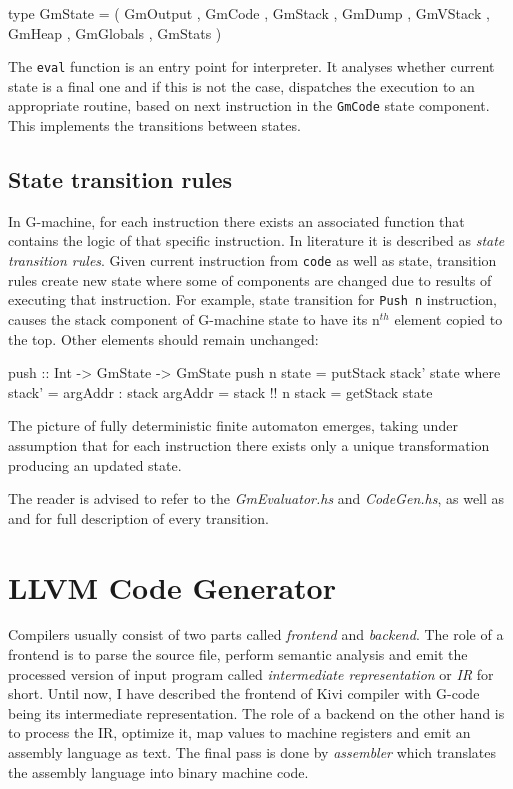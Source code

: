 \documentclass[12pt,a4paper]{report}
\begin{document}
\vspace*{0.2in}
\begin{code}[style=haskell]
  type GmState = ( GmOutput
                 , GmCode
                 , GmStack
                 , GmDump
                 , GmVStack
                 , GmHeap
                 , GmGlobals
                 , GmStats )
\end{code}

The \texttt{eval} function is an entry point for interpreter. It analyses
whether current state is a final one and if this is not the case, dispatches
the execution to an appropriate routine, based on next instruction in the
\texttt{GmCode} state component. This implements the transitions between states.

\subsection{State transition rules}
In G-machine, for each instruction there exists an associated function that
contains the logic of that specific instruction. In literature it is described
as \textit{state transition rules}. Given current instruction from
\texttt{code} as well as state, transition rules create new state where some of
components are changed due to results of executing that instruction. For
example, state transition for \texttt{Push n} instruction, causes the
stack component of G-machine state to have its n$^{th}$ element copied to
the top. Other elements should remain unchanged:

\vspace*{0.2in}
\begin{code}[style=haskell]
  push :: Int -> GmState -> GmState
  push n state =
      putStack stack' state
      where
          stack' = argAddr : stack
          argAddr = stack !! n
          stack = getStack state
\end{code}

The picture of fully deterministic finite automaton emerges, taking under
assumption that for each instruction there exists only a unique transformation
producing an updated state.

The reader is advised to refer to the \textit{GmEvaluator.hs} and
\textit{CodeGen.hs}, as well as \cite{Jon87} and \cite{JonLes00} for full
description of every transition.

\section{LLVM Code Generator}
\label{sec:llvm_codegen}
Compilers usually consist of two parts called \textit{frontend} and
\textit{backend}. The role of a frontend is to parse the source file, perform
semantic analysis and emit the processed version of input program called
\textit{intermediate representation} or \textit{IR} for short. Until now, I have
described the frontend of Kivi compiler with G-code being its intermediate
representation. The role of a backend on the other hand is to process the IR,
optimize it, map values to machine registers and emit an assembly language as
text. The final pass is done by \textit{assembler} which translates the
assembly language into binary machine code.
\end{document}
